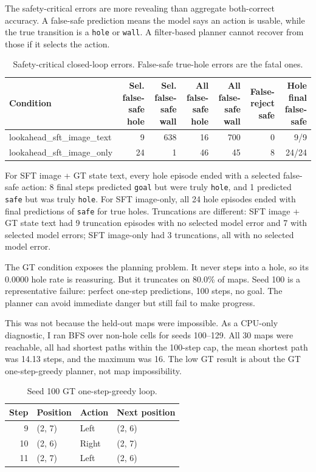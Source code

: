 \documentclass{article}
\newcommand{\code}[1]{\texttt{#1}}
\begin{document}
The safety-critical errors are more revealing than aggregate both-correct accuracy. A false-safe prediction means the model says an action is usable, while the true transition is a \code{hole} or \code{wall}. A filter-based planner cannot recover from those if it selects the action.

\begin{table}[t]
\caption{Safety-critical closed-loop errors. False-safe true-hole errors are the fatal ones.}
\label{tab:safety}
\centering
\scriptsize
\begin{tabular}{lrrrrrr}
\toprule
Condition & Sel. false-safe hole & Sel. false-safe wall & All false-safe hole & All false-safe wall & False-reject safe & Hole final false-safe \\
\midrule
lookahead\_sft\_image\_text & 9 & 638 & 16 & 700 & 0 & 9/9 \\
lookahead\_sft\_image\_only & 24 & 1 & 46 & 45 & 8 & 24/24 \\
\bottomrule
\end{tabular}
\end{table}

For SFT image + GT state text, every hole episode ended with a selected false-safe action: 8 final steps predicted \code{goal} but were truly \code{hole}, and 1 predicted \code{safe} but was truly \code{hole}. For SFT image-only, all 24 hole episodes ended with final predictions of \code{safe} for true holes. Truncations are different: SFT image + GT state text had 9 truncation episodes with no selected model error and 7 with selected model errors; SFT image-only had 3 truncations, all with no selected model error.

The GT condition exposes the planning problem. It never steps into a hole, so its 0.0000 hole rate is reassuring. But it truncates on 80.0\% of maps. Seed 100 is a representative failure: perfect one-step predictions, 100 steps, no goal. The planner can avoid immediate danger but still fail to make progress.

This was not because the held-out maps were impossible. As a CPU-only diagnostic, I ran BFS over non-hole cells for seeds 100--129. All 30 maps were reachable, all had shortest paths within the 100-step cap, the mean shortest path was 14.13 steps, and the maximum was 16. The low GT result is about the GT one-step-greedy planner, not map impossibility.

\begin{table}[t]
\caption{Seed 100 GT one-step-greedy loop.}
\label{tab:loop}
\centering
\small
\begin{tabular}{rlll}
\toprule
Step & Position & Action & Next position \\
\midrule
9 & (2, 7) & Left & (2, 6) \\
10 & (2, 6) & Right & (2, 7) \\
11 & (2, 7) & Left & (2, 6) \\
\bottomrule
\end{tabular}
\end{table}
\end{document}
